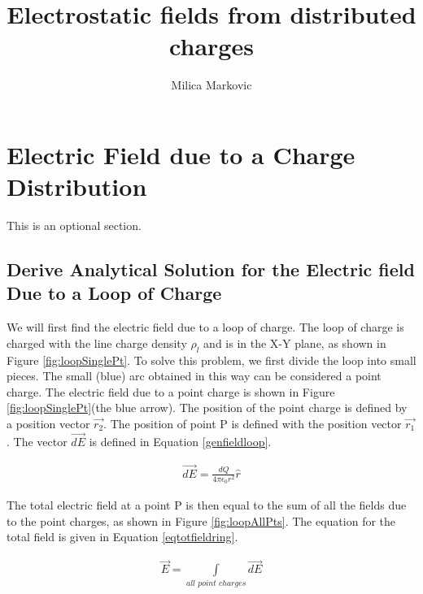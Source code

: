 \documentclass{ximera}
\title{Electrostatic fields from distributed charges}
\author{Milica Markovic}
\begin{document}
  
\begin{abstract}  

\end{abstract}  
\maketitle    


\section{Electric Field due to a Charge Distribution}


This is an optional section.

\subsection{Derive Analytical Solution for the Electric field Due to a Loop of Charge }



We will first find the electric field due to a loop of charge. The loop of charge is charged with the line charge density $\rho_l$ and is in the X-Y plane, as shown in Figure \ref{fig:loopSinglePt}.  To solve this problem, we first divide the loop into small pieces. The small (blue) arc obtained in this way can be considered a point charge. The electric field due to a point charge is shown in Figure \ref{fig:loopSinglePt}(the blue arrow).  The position of the point charge is defined by a position vector $\vec{r_2}$. The position of point P is defined with the position vector  $\vec{r_1}$. The vector  $\vec{dE}$ is defined in  Equation  \ref{genfieldloop}.


\begin{eqnarray}
\vec{dE}=\frac{dQ}{4 \pi \epsilon_{0} {r}^2} \hat{r} \label{genfieldloop}
\end{eqnarray}


The total electric field at a point P is then equal to the sum of all the fields due to the point charges, as shown in Figure \ref{fig:loopAllPts}. The equation for the total field is given in Equation \ref{eqtotfieldring}. 

\begin{eqnarray}
\vec{E}=\int\limits_{all \,\, point \,\, charges} \vec{dE} \label{eqtotfieldring}
\end{eqnarray}


\end{document}
